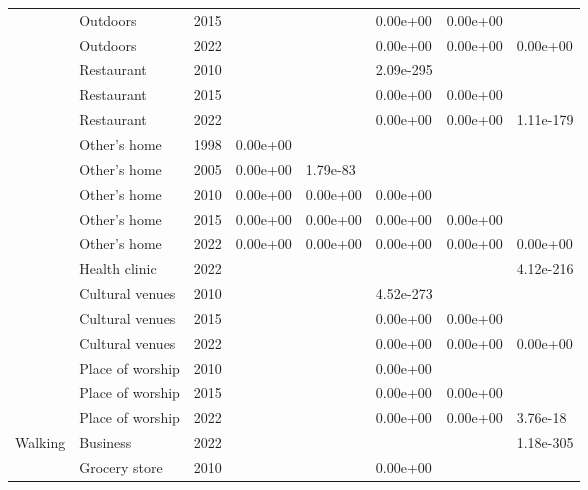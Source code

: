 \documentclass[preprint, 3p,
authoryear]{elsarticle} %
\begin{document}
\begin{table}
{\begin{tabular}[t]{llllllll}
 & Outdoors & 2015 &  &  & 0.00e+00 & 0.00e+00 & \\

 & Outdoors & 2022 &  &  & 0.00e+00 & 0.00e+00 & 0.00e+00\\

 & Restaurant & 2010 &  &  & 2.09e-295 &  & \\

 & Restaurant & 2015 &  &  & 0.00e+00 & 0.00e+00 & \\

 & Restaurant & 2022 &  &  & 0.00e+00 & 0.00e+00 & 1.11e-179\\

 & Other's home & 1998 & 0.00e+00 &  &  &  & \\

 & Other's home & 2005 & 0.00e+00 & 1.79e-83 &  &  & \\

 & Other's home & 2010 & 0.00e+00 & 0.00e+00 & 0.00e+00 &  & \\

 & Other's home & 2015 & 0.00e+00 & 0.00e+00 & 0.00e+00 & 0.00e+00 & \\

 & Other's home & 2022 & 0.00e+00 & 0.00e+00 & 0.00e+00 & 0.00e+00 & 0.00e+00\\

 & Health clinic & 2022 &  &  &  &  & 4.12e-216\\

 & Cultural venues & 2010 &  &  & 4.52e-273 &  & \\

 & Cultural venues & 2015 &  &  & 0.00e+00 & 0.00e+00 & \\

 & Cultural venues & 2022 &  &  & 0.00e+00 & 0.00e+00 & 0.00e+00\\

 & Place of worship & 2010 &  &  & 0.00e+00 &  & \\

 & Place of worship & 2015 &  &  & 0.00e+00 & 0.00e+00 & \\

 & Place of worship & 2022 &  &  & 0.00e+00 & 0.00e+00 & 3.76e-18\\

\multirow[t]{-34}{*}{\raggedright\arraybackslash Walking} & Business & 2022 &  &  &  &  & 1.18e-305\\
\cmidrule{1-8}
 & Grocery store & 2010 &  &  & 0.00e+00 &  & \\


\end{tabular}}
\end{table}
\end{document}
